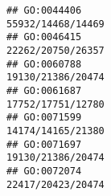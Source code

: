 \documentclass[
]{article}
\begin{document}
\begin{verbatim}
## GO:0044406                                                                                                                                                                                                                                                                                                                                                                                            55932/14468/14469
## GO:0046415                                                                                                                                                                                                                                                                                                                                                                                            22262/20750/26357
## GO:0060788                                                                                                                                                                                                                                                                                                                                                                                            19130/21386/20474
## GO:0061687                                                                                                                                                                                                                                                                                                                                                                                            17752/17751/12780
## GO:0071599                                                                                                                                                                                                                                                                                                                                                                                            14174/14165/21380
## GO:0071697                                                                                                                                                                                                                                                                                                                                                                                            19130/21386/20474
## GO:0072074                                                                                                                                                                                                                                                                                                                                                                                            22417/20423/20474

\end{verbatim}
\end{document}
